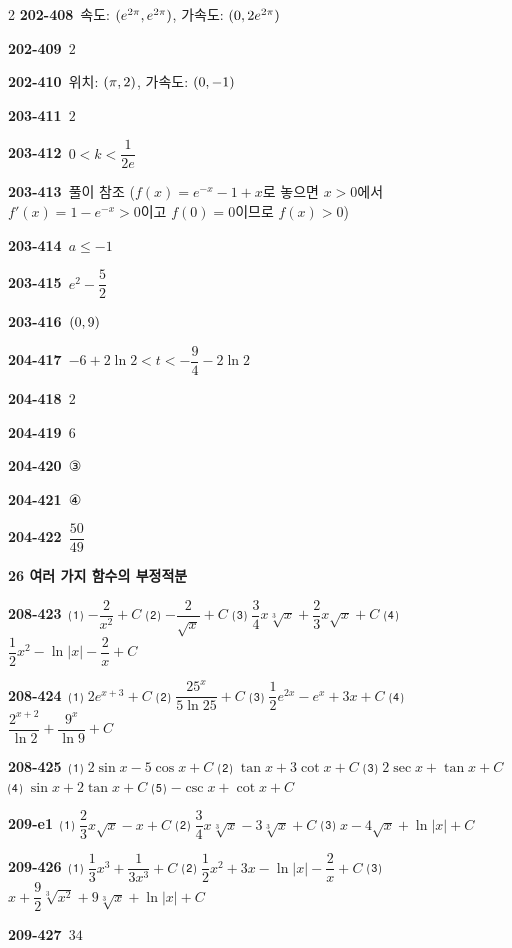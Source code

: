 \documentclass[10pt,a4paper]{article}
\begin{document}
\begin{multicols}{2}
\noindent\textbf{202-408}\ 속도: $(e^{2\pi}{,}\mkern3mu\mathopen{}e^{2\pi})$, 가속도: $(0{,}\mkern3mu\mathopen{}2e^{2\pi})$\par
\noindent\textbf{202-409}\ $2$\par
\noindent\textbf{202-410}\ 위치: $(\pi{,}\mkern3mu\mathopen{}2)$, 가속도: $(0{,}\mkern3mu\mathopen{}-1)$\par
\noindent\textbf{203-411}\ $2$\par
\noindent\textbf{203-412}\ $0<k<\dfrac{1}{2e}$\par
\noindent\textbf{203-413}\ 풀이 참조 ($f(x)=e^{-x}-1+x$로 놓으면 $x>0$에서 $f'(x)=1-e^{-x}>0$이고 $f(0)=0$이므로 $f(x)>0$)\par
\noindent\textbf{203-414}\ $a\le -1$\par
\noindent\textbf{203-415}\ $e^2-\dfrac{5}{2}$\par
\noindent\textbf{203-416}\ $(0{,}\mkern3mu\mathopen{}9)$\par
\noindent\textbf{204-417}\ $-6+2\ln 2<t<-\dfrac{9}{4}-2\ln 2$\par
\noindent\textbf{204-418}\ $2$\par
\noindent\textbf{204-419}\ $6$\par
\noindent\textbf{204-420}\ ③\par
\noindent\textbf{204-421}\ ④\par
\noindent\textbf{204-422}\ $\dfrac{50}{49}$\par
\noindent\textbf{26 여러 가지 함수의 부정적분}\par\smallskip
\noindent\textbf{208-423}\ ⑴ $-\dfrac{2}{x^2}+C$ ⑵ $-\dfrac{2}{\sqrt{x}}+C$ ⑶ $\dfrac{3}{4}x\sqrt[3]{x}+\dfrac{2}{3}x\sqrt{x}+C$ ⑷ $\dfrac{1}{2}x^2-\ln|x|-\dfrac{2}{x}+C$\par
\noindent\textbf{208-424}\ ⑴ $2e^{x+3}+C$ ⑵ $\dfrac{25^x}{5\ln 25}+C$ ⑶ $\dfrac{1}{2}e^{2x}-e^x+3x+C$ ⑷ $\dfrac{2^{x+2}}{\ln 2}+\dfrac{9^x}{\ln 9}+C$\par
\noindent\textbf{208-425}\ ⑴ $2\sin x-5\cos x+C$ ⑵ $\tan x+3\cot x+C$ ⑶ $2\sec x+\tan x+C$ ⑷ $\sin x+2\tan x+C$ ⑸ $-\csc x+\cot x+C$\par
\noindent\textbf{209-e1}\ ⑴ $\dfrac{2}{3}x\sqrt{x}-x+C$ ⑵ $\dfrac{3}{4}x\sqrt[3]{x}-3\sqrt[3]{x}+C$ ⑶ $x-4\sqrt{x}+\ln|x|+C$\par
\noindent\textbf{209-426}\ ⑴ $\dfrac{1}{3}x^3+\dfrac{1}{3x^3}+C$ ⑵ $\dfrac{1}{2}x^2+3x-\ln|x|-\dfrac{2}{x}+C$ ⑶ $x+\dfrac{9}{2}\sqrt[3]{x^2}+9\sqrt[3]{x}+\ln|x|+C$\par
\noindent\textbf{209-427}\ $34$\par

\end{multicols}
\end{document}
